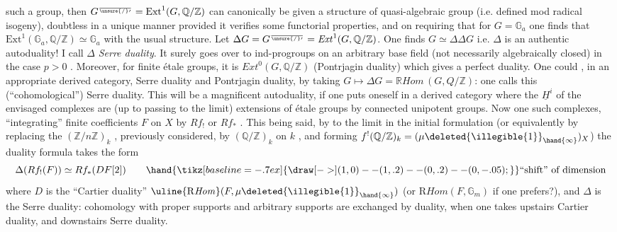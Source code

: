 
 such a group, then $G^{\over{\unsure{/}}{\prime}} = \mathrm{Ext}^1(G, \mathbb{Q}/\mathbb{Z})$ can canonically be given a structure
of quasi-algebraic group (i.e. defined mod radical isogeny), doubtless in
a unique manner provided it verifies some functorial properties, and on
requiring that for $G = \mathbb{G}_a$ one finds that $\mathrm{Ext}^1(\mathbb{G}_a, \mathbb{Q}/\mathbb{Z}) \simeq \mathbb{G}_a$ with the
 usual structure. Let $\Delta G = G^{\over{\unsure{/}}{\prime}} = \mathit{Ext}^1(G, \mathbb{Q}/\mathbb{Z})$. One finds $G \simeq \Delta\Delta G$ i.e. $\Delta$
is an authentic autoduality! I call $\Delta$ \textit{Serre duality}. It surely goes over
to ind-progroups on an arbitrary base field (not necessarily algebraically closed)
in the case $p > 0$ . Moreover, for finite étale groups, it is $\mathit{Ext}^0(G, \mathbb{Q}/\mathbb{Z})$
(Pontrjagin duality) which gives a perfect duality. One could , in
an appropriate derived category, Serre duality and Pontrjagin duality, by
taking $G \longmapsto \Delta G = \mathbb{R}\mathit{Hom}\,(G, Q/\mathbb{Z})$: one calls this (``cohomological'') Serre
duality. This will be a magnificent autoduality, if one puts oneself in a
derived category where the $\underline{H}^i$ of the envisaged complexes are (up to
passing to the limit) extensions of étale groups by connected unipotent
groups. Now one   such complexes,  ``integrating'' finite coefficients
$F$ on $X$ by $Rf_!$ or $Rf_*$ . This being said, by   to the limit in
the initial formulation (or equivalently by replacing the $(\mathbb{Z}/n\mathbb{Z})_k$ ,
previously considered, by $(\mathbb{Q}/\mathbb{Z})_k$ on $k$ , and forming $f^!(\mathbb{Q}/\mathbb{Z})_k = (\mu\deleted{\illegible{1}}_{\hand{\infty}})_X$)
the duality formula takes the form
\[ \Delta(Rf_!(F)) \simeq Rf_*(DF[2]) \qquad \hand{\tikz[baseline=-.7ex]{\draw[->] (1,0)--(1,.2)--(0,.2)--(0,-.05);}}\text{``shift'' of dimension} \]
where $D$ is the ``Cartier duality'' $\uline{\mathrm{R}\mathit{Hom}}(F, \mu\deleted{\illegible{1}}_{\hand{\infty}})$ (or $\mathrm{R}\mathit{Hom}(F, \mathbb{G}_m)$ if one
prefers?), and $\Delta$ is the Serre duality: cohomology with proper supports and 
arbitrary supports are exchanged by duality, when one takes upstairs Cartier
duality, and downstairs Serre duality.

